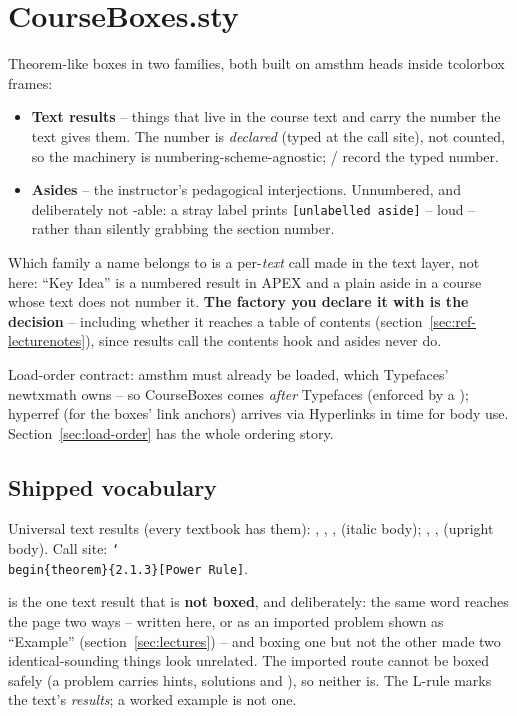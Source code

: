 \section{CourseBoxes.sty}\label{sec:ref-courseboxes}

Theorem-like boxes in two families, both built on amsthm heads inside
tcolorbox frames:

\begin{itemize}
  \item \textbf{Text results} -- things that live in the course text and
    carry the number the text gives them. The number is \emph{declared}
    (typed at the call site), not counted, so the machinery is
    numbering-scheme-agnostic; / record the typed number.
  \item \textbf{Asides} -- the instructor's pedagogical interjections.
    Unnumbered, and deliberately not -able: a stray label prints
    \texttt{[unlabelled aside]} -- loud -- rather than silently grabbing
    the section number.
\end{itemize}

Which family a name belongs to is a per-\emph{text} call made in the text
layer, not here: ``Key Idea'' is a numbered result in APEX and a plain
aside in a course whose text does not number it. \textbf{The factory you
declare it with is the decision} -- including whether it reaches a table of
contents (section~\ref{sec:ref-lecturenotes}), since results call the
contents hook and asides never do.

Load-order contract: amsthm must already be loaded, which Typefaces'
newtxmath owns -- so CourseBoxes comes \emph{after} Typefaces (enforced by
a ); hyperref (for the boxes' link anchors) arrives via
Hyperlinks in time for body use. Section~\ref{sec:load-order} has the whole
ordering story.

\subsection*{Shipped vocabulary}

Universal text results (every textbook has them):
, , ,  (italic
body); , ,  (upright body). Call
site: \texttt{\char`\\begin\{theorem\}\{2.1.3\}[Power Rule]}.

 is the one text result that is \textbf{not boxed}, and
deliberately: the same word reaches the page two ways -- written here, or
as an imported problem shown as ``Example'' (section~\ref{sec:lectures}) --
and boxing one but not the other made two identical-sounding things look
unrelated. The imported route cannot be boxed safely (a problem carries
hints, solutions and ), so neither is. The L-rule marks the
text's \emph{results}; a worked example is not one.

